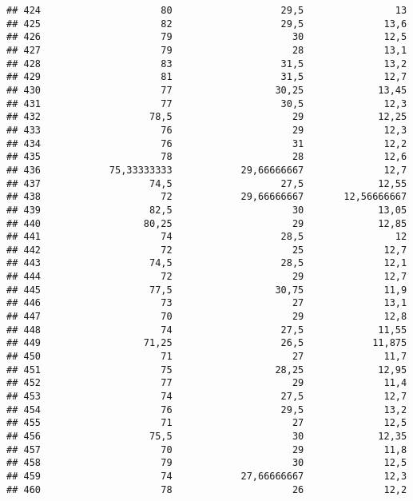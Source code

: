 \documentclass[
]{article}
\begin{document}
\begin{verbatim}
## 424                     80                   29,5                13
## 425                     82                   29,5              13,6
## 426                     79                     30              12,5
## 427                     79                     28              13,1
## 428                     83                   31,5              13,2
## 429                     81                   31,5              12,7
## 430                     77                  30,25             13,45
## 431                     77                   30,5              12,3
## 432                   78,5                     29             12,25
## 433                     76                     29              12,3
## 434                     76                     31              12,2
## 435                     78                     28              12,6
## 436            75,33333333            29,66666667              12,7
## 437                   74,5                   27,5             12,55
## 438                     72            29,66666667       12,56666667
## 439                   82,5                     30             13,05
## 440                  80,25                     29             12,85
## 441                     74                   28,5                12
## 442                     72                     25              12,7
## 443                   74,5                   28,5              12,1
## 444                     72                     29              12,7
## 445                   77,5                  30,75              11,9
## 446                     73                     27              13,1
## 447                     70                     29              12,8
## 448                     74                   27,5             11,55
## 449                  71,25                   26,5            11,875
## 450                     71                     27              11,7
## 451                     75                  28,25             12,95
## 452                     77                     29              11,4
## 453                     74                   27,5              12,7
## 454                     76                   29,5              13,2
## 455                     71                     27              12,5
## 456                   75,5                     30             12,35
## 457                     70                     29              11,8
## 458                     79                     30              12,5
## 459                     74            27,66666667              12,3
## 460                     78                     26              12,2

\end{verbatim}
\end{document}

